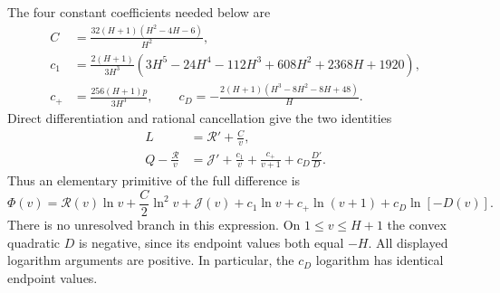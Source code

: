 The four constant coefficients needed below are
\begin{align}
 C&=\frac{32(H+1)(H^2-4H-6)}{H^2},\\
 c_1&=\frac{2(H+1)}{3H^3}
 (3H^5-24H^4-112H^3+608H^2+2368H+1920),\\
 c_+&=\frac{256(H+1)p}{3H^3},\qquad
 c_D=-\frac{2(H+1)(H^3-8H^2-8H+48)}H.
\end{align}
Direct differentiation and rational cancellation give the two identities
\begin{align}
 L&=\mathcal R'+\frac Cv,\\
 Q-\frac{\mathcal R}{v}
 &=\mathcal J'+\frac{c_1}{v}+\frac{c_+}{v+1}
                      +c_D\frac{D'}D.
\end{align}
Thus an elementary primitive of the full difference is
\begin{equation}
 \Phi(v)=\mathcal R(v)\ln v+\frac C2\ln^2v+\mathcal J(v)
             +c_1\ln v+c_+\ln(v+1)+c_D\ln[-D(v)].
\end{equation}
There is no unresolved branch in this expression.  On $1\leq v\leq H+1$
the convex quadratic $D$ is negative, since its endpoint values both
 equal $-H$.  All displayed logarithm arguments are positive.
In particular, the $c_D$ logarithm has identical endpoint values.

